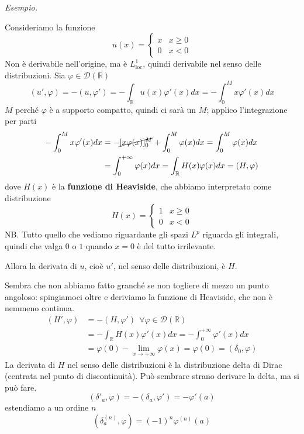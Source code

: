 \textit{Esempio.}

Consideriamo la funzione
\begin{equation*}
u( x) =\begin{cases}
x & x\geqslant 0\\
0 & x< 0
\end{cases}
\end{equation*}
Non è derivabile nell'origine, ma è $L^{1}_{\mathrm{loc}}$, quindi derivabile nel senso delle distribuzioni. Sia $\varphi \in \mathcal{D}(\mathbb{R})$
\begin{equation*}
( u',\varphi ) =-( u,\varphi ') =-\int _{\mathbb{R}} u( x) \varphi '( x) dx=-\int ^{M}_{0} x\varphi '( x) dx
\end{equation*}
$M$ perché $\varphi $ è a supporto compatto, quindi ci sarà un $M$; applico l'integrazione per parti
\begin{align*}
-\int ^{M}_{0} x\varphi '( x) dx & =-\cancel{[ x\varphi ( x)]^{M}_{0}} +\int ^{M}_{0} \varphi ( x) dx=\int ^{M}_{0} \varphi ( x) dx\\
 & =\int ^{+\infty }_{0} \varphi ( x) dx=\int _{\mathbb{R}} H( x) \varphi ( x) dx=( H,\varphi )
\end{align*}
dove $H( x)$ è la \textbf{funzione di Heaviside}, che abbiamo interpretato come distribuzione
\begin{equation*}
H( x) =\begin{cases}
1 & x\geqslant 0\\
0 & x< 0
\end{cases}
\end{equation*}
NB. Tutto quello che vediamo riguardante gli spazi $L^{p}$ riguarda gli integrali, quindi che valga $0$ o $1$ quando $x=0$ è del tutto irrilevante.

Allora la derivata di $u$, cioè $u'$, nel senso delle distribuzioni, è $H$.

Sembra che non abbiamo fatto granché se non togliere di mezzo un punto angoloso: spingiamoci oltre e deriviamo la funzione di Heaviside, che non è nemmeno continua.
\begin{align*}
( H',\varphi ) & =-( H,\varphi ') \ \ \forall \varphi \in \mathcal{D}(\mathbb{R})\\
 & =-\int _{\mathbb{R}} H( x) \varphi '( x) dx=-\int ^{+\infty }_{0} \varphi '( x) dx\\
 & =\varphi ( 0) -\lim _{x\rightarrow +\infty } \varphi ( x) =\varphi ( 0) =( \delta _{0} ,\varphi )
\end{align*}
La derivata di $H$ nel senso delle distribuzioni è la distribuzione delta di Dirac (centrata nel punto di discontinuità). Può sembrare strano derivare la delta, ma si può fare.
\begin{equation*}
( \delta '_{a} ,\varphi ) =-( \delta _{a} ,\varphi ') =-\varphi '( a)
\end{equation*}
estendiamo a un ordine $n$
\begin{equation*}
\left( \delta ^{( n)}_{a} ,\varphi \right) =( -1)^{n} \varphi ^{( n)}( a)
\end{equation*}

